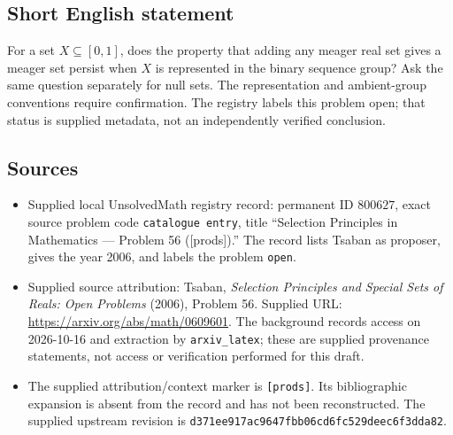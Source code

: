 \documentclass[11pt]{article}
\begin{document}
\subsection{Short English statement}
For a set \(X\subseteq[0,1]\), does the property that adding any meager real set gives a meager set persist when \(X\) is represented in the binary sequence group? Ask the same question separately for null sets. The representation and ambient-group conventions require confirmation. The registry labels this problem open; that status is supplied metadata, not an independently verified conclusion.
\subsection{Sources}
\begin{itemize}
\item Supplied local UnsolvedMath registry record: permanent ID \(800627\), exact source problem code \texttt{catalogue entry}, title ``Selection Principles in Mathematics --- Problem 56 ([prods]).'' The record lists Tsaban as proposer, gives the year 2006, and labels the problem \texttt{open}.
\item Supplied source attribution: Tsaban, \emph{Selection Principles and Special Sets of Reals: Open Problems} (2006), Problem 56. Supplied URL: \url{https://arxiv.org/abs/math/0609601}. The background records access on 2026-10-16 and extraction by \texttt{arxiv\_latex}; these are supplied provenance statements, not access or verification performed for this draft.
\item The supplied attribution/context marker is \texttt{[prods]}. Its bibliographic expansion is absent from the record and has not been reconstructed. The supplied upstream revision is \texttt{d371ee917ac9647fbb06cd6fc529deec6f3dda82}.
\end{itemize}
\end{document}
